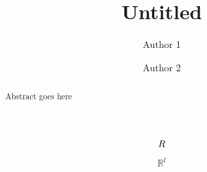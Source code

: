 \documentclass{statsoc}
\title[Untitled]{Untitled}
\author[Author 1 et. al.]{Author 1}
\author[Author 1 et. al.]{Author 2}
\begin{document}
\begin{abstract}
Abstract goes here
\end{abstract}

\[
\\R
\]

\[
\mathbb{R}^l
\]



\end{document}
